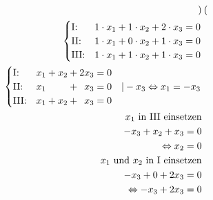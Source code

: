 \begin{align*}
\begin{pmatrix}
                                                    \end{pmatrix}                                                                                                    \\
    \begin{cases}
        \text{I:\@}   & 1 \cdot x_1 + 1 \cdot x_2 + 2 \cdot x_3 = 0 \\
        \text{II:\@}  & 1 \cdot x_1 + 0 \cdot x_2 + 1 \cdot x_3 = 0 \\
        \text{III:\@} & 1 \cdot x_1 + 1 \cdot x_2 + 1 \cdot x_3 = 0
    \end{cases}                                                                                                                 \\
    \begin{cases}
        \text{I:\@}   & x_1 + x_2 + 2x_3 = 0                                                                \\
        \text{II:\@}  & x_1 \phantom{{}+x_2} + \phantom{{}2}x_3 = 0 \quad | -x_3 \Leftrightarrow x_1 = -x_3 \\
        \text{III:\@} & x_1 + x_2 + \phantom{{}2}x_3 = 0
    \end{cases} \\
    x_1 \text{ in III einsetzen}                                                                                                                                                \\
    -x_3 + x_2 + x_3 = 0                                                                                                                                                        \\
    \Leftrightarrow x_2 = 0                                                                                                                                                     \\
    x_1 \text{ und } x_2 \text{ in I einsetzen}                                                                                                                                 \\
    -x_3 + 0 + 2x_3 = 0                                                                                                                                                         \\
    \Leftrightarrow -x_3 + 2x_3 = 0                                                                                                                                             \\

\end{align*}
